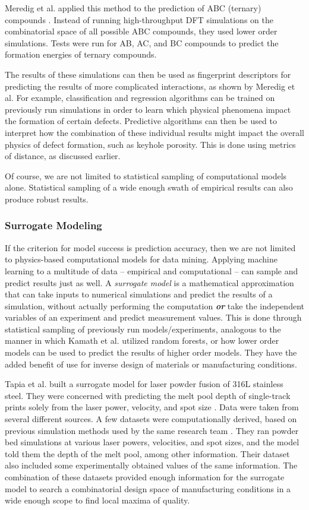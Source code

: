 Meredig et al. applied this method to the prediction of ABC (ternary) compounds \cite{Meredig2014}. Instead of running high-throughput DFT simulations on the combinatorial space of all possible ABC compounds, they used lower order simulations. Tests were run for AB, AC, and BC compounds to predict the formation energies of ternary compounds.

The results of these simulations can then be used as fingerprint descriptors for predicting the results of more complicated interactions, as shown by Meredig et al. For example, classification and regression algorithms can be trained on previously run simulations in order to learn which physical phenomena impact the formation of certain defects. Predictive algorithms can then be used to interpret how the combination of these individual results might impact the overall physics of defect formation, such as keyhole porosity. This is done using metrics of distance, as discussed earlier. 

Of course, we are not limited to statistical sampling of computational models alone. Statistical sampling of a wide enough swath of empirical results can also produce robust results. 

\subsubsection{Surrogate Modeling}

If the criterion for model success is prediction accuracy, then we are not limited to physics-based computational models for data mining. Applying machine learning to a multitude of data -- empirical and computational -- can sample and predict results just as well. A \textit{surrogate model} is a mathematical approximation that can take inputs to numerical simulations and predict the results of a simulation, without actually performing the computation \textbf{\textit{or}} take the independent variables of an experiment and predict measurement values. This is done through statistical sampling of previously run models/experiments, analogous to the manner in which Kamath et al. utilized random forests, or how lower order models can be used to predict the results of higher order models. They have the added benefit of use for inverse design of materials or manufacturing conditions. 

Tapia et al. built a surrogate model for laser powder fusion of 316L stainless steel. They were concerned with predicting the melt pool depth of single-track prints solely from the laser power, velocity, and spot size \cite{Tapia2017}. Data were taken from several different sources. A few datasets were computationally derived, based on previous simulation methods used by the same research team \cite{King2014, Khairallah2016}. They ran powder bed simulations at various laser powers, velocities, and spot sizes, and the model told them the depth of the melt pool, among other information. Their dataset also included some experimentally obtained values of the same information. The combination of these datasets provided enough information for the surrogate model to search a combinatorial design space of manufacturing conditions in a wide enough scope to find local maxima of quality.

